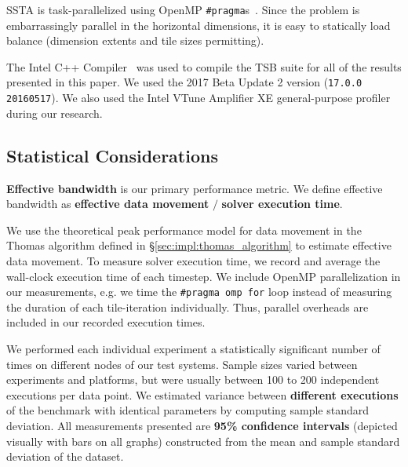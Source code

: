 \documentclass[10pt, conference, compsocconf]{IEEEtran}
\begin{document}
SSTA is task-parallelized using OpenMP \lstinline{#pragma}s~\cite{openmp_spec}.
Since the problem is embarrassingly parallel in the horizontal dimensions, it
  is easy to statically load balance (dimension extents and tile sizes
  permitting).

The Intel C++ Compiler~\cite{intel_cpp_compiler} was used to compile the TSB
  suite for all of the results presented in this paper.
We used the 2017 Beta Update 2 version (\lstinline{17.0.0 20160517}).
We also used the Intel VTune Amplifier XE general-purpose
  profiler~\cite{intel_vtune_amplifier} during our research.

\subsection{Statistical Considerations}
\label{sec:setup:stats}

\textbf{Effective bandwidth} is our primary performance metric.
We define effective bandwidth as \textbf{effective data movement} \(/\)
  \textbf{solver execution time}.

We use the theoretical peak performance model for data movement in the Thomas
  algorithm defined in \S\ref{sec:impl:thomas_algorithm} to estimate
  effective data movement.
To measure solver execution time, we record and average the wall-clock
  execution time of each timestep. 
We include OpenMP parallelization in our measurements, e.g. we time the
  \lstinline{#pragma omp for} loop instead of measuring the duration of each
  tile-iteration individually.
Thus, parallel overheads are included in our recorded execution times.

We performed each individual experiment a statistically significant number of 
  times on different nodes of our test systems.
Sample sizes varied between experiments and platforms, but were usually between
  100 to 200 independent executions per data point.
We estimated variance between \textbf{different
  executions} of the benchmark with identical parameters by computing sample
  standard deviation.
All measurements presented are \textbf{95\% confidence intervals} (depicted
  visually with bars on all graphs) constructed from the mean and sample standard
  deviation of the dataset.
\end{document}
